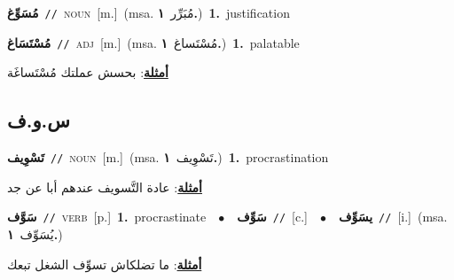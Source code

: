 \documentclass[10pt,a4paper,twoside]{article} %
\begin{document}
\begin{multicols}{2}
{\setlength\topsep{0pt}\textbf{\foreignlanguage{arabic}{مُسَوِّغ}}\ {\color{gray}\texttt{//}\color{black}}\ \textsc{noun}\ [m.]\ \color{gray}(msa. \foreignlanguage{arabic}{مُبَرِّر}~\foreignlanguage{arabic}{\textbf{١.}})\color{black}\ \textbf{1.}~justification\ } \vspace{2mm}

{\setlength\topsep{0pt}\textbf{\foreignlanguage{arabic}{مُسْتَسَاغ}}\ {\color{gray}\texttt{//}\color{black}}\ \textsc{adj}\ [m.]\ \color{gray}(msa. \foreignlanguage{arabic}{مُسْتَساغ}~\foreignlanguage{arabic}{\textbf{١.}})\color{black}\ \textbf{1.}~palatable\  \begin{flushright}\color{gray}\foreignlanguage{arabic}{\textbf{\underline{\foreignlanguage{arabic}{أمثلة}}}: بحسش عملتك مُسْتَساغَة}\end{flushright}\color{black}} \vspace{2mm}

\vspace{-3mm}
\subsection*{\color{blue}\foreignlanguage{arabic}{س.و.ف}\color{blue}{}} 

{\setlength\topsep{0pt}\textbf{\foreignlanguage{arabic}{تَسْوِيف}}\ {\color{gray}\texttt{//}\color{black}}\ \textsc{noun}\ [m.]\ \color{gray}(msa. \foreignlanguage{arabic}{تَسْوِيف}~\foreignlanguage{arabic}{\textbf{١.}})\color{black}\ \textbf{1.}~procrastination\  \begin{flushright}\color{gray}\foreignlanguage{arabic}{\textbf{\underline{\foreignlanguage{arabic}{أمثلة}}}: عادة التَّسويف عندهم أبا عن جد}\end{flushright}\color{black}} \vspace{2mm}

{\setlength\topsep{0pt}\textbf{\foreignlanguage{arabic}{سَوَّف}}\ {\color{gray}\texttt{//}\color{black}}\ \textsc{verb}\ [p.]\ \textbf{1.}~procrastinate\ \ $\bullet$\ \ \setlength\topsep{0pt}\textbf{\foreignlanguage{arabic}{سَوِّف}}\ {\color{gray}\texttt{//}\color{black}}\ [c.]\ \ $\bullet$\ \ \setlength\topsep{0pt}\textbf{\foreignlanguage{arabic}{يسَوِّف}}\ {\color{gray}\texttt{//}\color{black}}\ [i.]\ \color{gray}(msa. \foreignlanguage{arabic}{يُسَوِّف}~\foreignlanguage{arabic}{\textbf{١.}})\color{black}\  \begin{flushright}\color{gray}\foreignlanguage{arabic}{\textbf{\underline{\foreignlanguage{arabic}{أمثلة}}}: ما تضلكاش تسوِّف الشغل تبعك}\end{flushright}\color{black}} \vspace{2mm}


\end{multicols}
\end{document}
